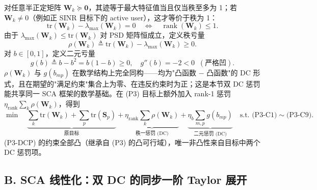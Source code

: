 \documentclass[12pt,a4paper]{article}
\newcommand{\mat}[1]{\mathbf{#1}}
\newcommand{\tr}{\text{tr}}
\DeclareMathOperator{\rank}{rank}
\begin{document}
对任意半正定矩阵 $\mat{W}_k \succeq \mat{0}$，其迹等于最大特征值当且仅当秩至多为 1；若 $\mat{W}_k\neq0$（例如正 SINR 目标下的 active user），这才等价于秩为 1：
\begin{equation}\label{eq:rank1-equivalence}
\tr(\mat{W}_k) - \lambda_{\max}(\mat{W}_k) = 0 \quad \Longleftrightarrow \quad \rank(\mat{W}_k) \leq 1.
\end{equation}
由于 $\lambda_{\max}(\mat{W}_k) \leq \tr(\mat{W}_k)$ 对 PSD 矩阵恒成立，定义秩亏量
\begin{equation}\label{eq:rho-def}
\rho(\mat{W}_k) \triangleq \tr(\mat{W}_k) - \lambda_{\max}(\mat{W}_k) \geq 0.
\end{equation}
对 $b \in [0,1]$，定义二元亏量
\begin{equation}\label{eq:g-def}
g(b) \triangleq b - b^2 = b(1-b) \geq 0, \quad g''(b) = -2 < 0 \;\; (\text{严格凹}).
\end{equation}
$\rho(\mat{W}_k)$ 与 $g(b_{mp})$ 在数学结构上完全同构——均为"凸函数 $-$ 凸函数"的 DC 形式，且在期望的"满足约束"集合上为零、在违反约束时为正；这是本节双 DC 惩罚能共享同一 SCA 框架的数学基础。在 (P3) 目标上额外加入 rank-1 惩罚 $\eta_{\text{rank}} \sum_k \rho(\mat{W}_k)$，得到
\begin{equation}\label{eq:p3-dcp}
\min \quad \underbrace{\sum_k \tr(\mat{W}_k) + \sum_p \tr(\mat{S}_p)}_{\text{原目标}} + \underbrace{\eta_{\text{rank}} \sum_k \rho(\mat{W}_k)}_{\text{秩一惩罚 (DC)}} + \underbrace{\eta_b \sum_{m,p} g(b_{mp})}_{\text{二元惩罚 (DC)}} \quad \text{s.t. (P3-C1)} \sim \text{(P3-C9)}.
\end{equation}
(P3-DCP) 的约束全部凸（继承自 (P3) 的凸可行域），唯一非凸性来自目标中两个 DC 惩罚项。

\subsection*{B. SCA 线性化：双 DC 的同步一阶 Taylor 展开}
\end{document}
